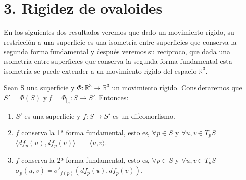 \chapter*{3. Rigidez de ovaloides}





En los siguientes dos resultados veremos que dado un movimiento rígido, su restricción a una superficie es una isometría entre superficies que conserva la segunda forma fundamental y después veremos su reciproco, que dada una isometría entre superficies que conserva la segunda forma fundamental esta isometría se puede extender a un movimiento rígido del espacio $\mathbb{R}^3$.
${ }$\\

\begin{proposicion}\label{prop:rig1} %
	Sean S una superficie y  $\Phi : \mathbb{R}^3 \to \mathbb{R}^3$  un movimiento rígido. Consideraremos que $S' = \Phi(S)$ y $f = \Phi_{\mid_{S}} : S \to S'$. Entonces:
	\begin{enumerate}
		\item $S'$ es una superficie y $f : S \to S'$ es un difeomorfismo.
		\item $f$ conserva la 1ª forma fundamental, esto es, $\forall p \in S$ y $\forall u,v \in T_p S$ $\langle df_p(u), df_p(v) \rangle $ $=$ $ \langle u, v \rangle$.
		\item $f$ conserva la 2ª forma fundamental, esto es, $\forall p \in S$ y $\forall u,v \in T_p S$ $\sigma_p(u,v) = \sigma'_{f(p)}(df_p(u), df_p(v))$.
	\end{enumerate}
\end{proposicion}

